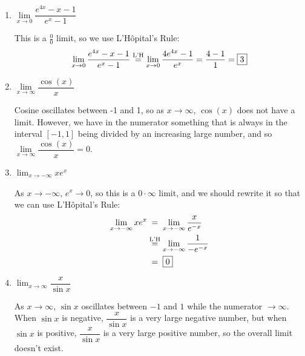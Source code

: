 \documentclass{article}
\begin{document}
\begin{enumerate}
\begin{enumerate}
        \item $\lim\limits_{x \to 0} \dfrac{e^{4x}-x-1}{e^x - 1}$
        
        \begin{solution}
                This is a $\frac{0}{0}$ limit, so we use L'H\^opital's Rule:
                \[\lim\limits_{x \to 0} \dfrac{e^{4x}-x-1}{e^x - 1} \stackrel{\text{L'H}}{=} \lim\limits_{x \to 0} \dfrac{4e^{4x}-1}{e^x} = \dfrac{4-1}{1} = \boxed{3}\]
        \end{solution}
        \probonly{\vfill}
    
    \item $\lim\limits_{x \to \infty} \dfrac{\cos(x)}{x}$
        
        \begin{solution}
                Cosine oscillates between -1 and 1, so as $x \to \infty$, $\cos(x)$ does not have a limit. However, we have in the numerator something that is always in the interval $[-1,1]$ being divided by an increasing large number, and so  $\lim\limits_{x \to \infty} \dfrac{\cos(x)}{x} = \boxed{0}$.
        \end{solution}
        \probonly{\vfill}

    \probonly{\newpage}

    \item $\displaystyle \lim_{x \to -\infty} x e^x$
    
    \begin{solution}
    As $x \to -\infty$, $e^x \to 0$, so this is a $0 \cdot \infty$
    limit, and we should rewrite it so that we can use L'Hôpital's
    Rule:
    \begin{align*}
      \lim_{x \to -\infty} x e^x & \nolheq \lim_{x \to -\infty}
      \frac{x}{e^{-x}} \\
      & \lheq \lim_{x \to -\infty} \frac{1}{-e^{-x}} \\
      & \nolheq \boxed{0}
    \end{align*}
  \end{solution}
  \probonly{\vfill}

  \item $\displaystyle\lim_{x\to \infty} \dfrac{x}{\sin x}$
  
  \begin{solution}
      As $x\to \infty$, $\sin x$ oscillates between $-1$ and $1$ while the numerator $\to \infty$. When $\sin x$ is negative, $\dfrac{x}{\sin x}$ is a very large negative number, but when $\sin x$ is positive, $\dfrac{x}{\sin x}$ is a very large positive number, so the overall limit doesn't exist. 
  \end{solution}
  \probonly{\vfill}


\end{enumerate}
\end{enumerate}
\end{document}
